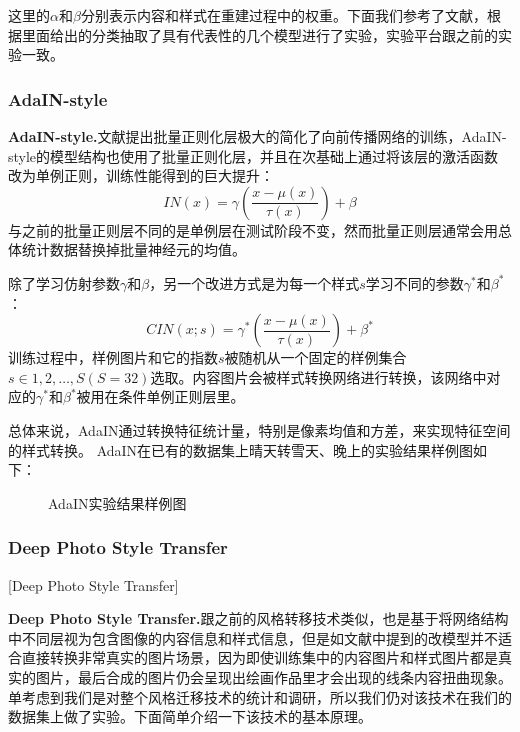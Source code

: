 这里的$\alpha$和$\beta$分别表示内容和样式在重建过程中的权重。下面我们参考了文献\cite{nst-survey}，根据里面给出的分类抽取了具有代表性的几个模型进行了实验，实验平台跟之前的实验一致。

\subsubsection[AdaIN-style]{AdaIN-style}

\textbf{AdaIN-style.}\cite{adain}\quad 文献\cite{ioffe}提出批量正则化层极大的简化了向前传播网络的训练，AdaIN-style的模型结构也使用了批量正则化层，并且在次基础上通过将该层的激活函数改为单例正则，训练性能得到的巨大提升：
$$ IN(x)=\gamma(\frac{x-\mu(x)}{\tau(x)})+\beta$$
与之前的批量正则层不同的是单例层在测试阶段不变，然而批量正则层通常会用总体统计数据替换掉批量神经元的均值。

除了学习仿射参数$\gamma$和$\beta$，另一个改进方式是为每一个样式$s$学习不同的参数$\gamma^*$和$\beta^*$：
$$CIN(x;s)=\gamma^*(\frac{x-\mu(x)}{\tau(x)})+\beta^*$$
训练过程中，样例图片和它的指数$s$被随机从一个固定的样例集合$s\in {1,2,\dots,S}(S=32)$选取。内容图片会被样式转换网络进行转换，该网络中对应的$\gamma^*$和$\beta^*$被用在条件单例正则层里。

总体来说，AdaIN通过转换特征统计量，特别是像素均值和方差，来实现特征空间的样式转换。
AdaIN在已有的数据集上晴天转雪天、晚上的实验结果样例图如下：
\begin{figure}[h]
    \centering
    \caption{AdaIN实验结果样例图}
\end{figure}


\subsubsection{Deep Photo Style Transfer}[Deep Photo Style Transfer]

\textbf{Deep Photo Style Transfer.}\cite{dpst}\quad  跟之前的风格转移技术类似，也是基于将网络结构中不同层视为包含图像的内容信息和样式信息，但是如文献中提到的改模型并不适合直接转换非常真实的图片场景，因为即使训练集中的内容图片和样式图片都是真实的图片，最后合成的图片仍会呈现出绘画作品里才会出现的线条内容扭曲现象。单考虑到我们是对整个风格迁移技术的统计和调研，所以我们仍对该技术在我们的数据集上做了实验。下面简单介绍一下该技术的基本原理。

